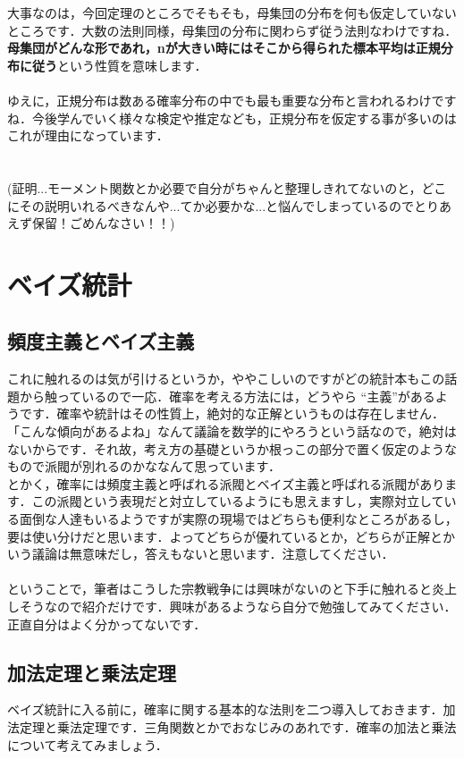 \documentclass[11pt,a4paper,uplatex]{ujreport} 	%
\begin{document}
大事なのは，今回定理のところでそもそも，母集団の分布を何も仮定していないところです．大数の法則同様，母集団の分布に関わらず従う法則なわけですね．\\

\textbf{母集団がどんな形であれ，nが大きい時にはそこから得られた標本平均は正規分布に従う}という性質を意味します．\\
\\

ゆえに，正規分布は数ある確率分布の中でも最も重要な分布と言われるわけですね．今後学んでいく様々な検定や推定なども，正規分布を仮定する事が多いのはこれが理由になっています．\\
\\
\\

(証明...モーメント関数とか必要で自分がちゃんと整理しきれてないのと，どこにその説明いれるべきなんや...てか必要かな...と悩んでしまっているのでとりあえず保留！ごめんなさい！！)


\newpage
\chapter{ベイズ統計}
\section{頻度主義とベイズ主義}
これに触れるのは気が引けるというか，ややこしいのですがどの統計本もこの話題から触っているので一応．確率を考える方法には，どうやら ``主義''があるようです．確率や統計はその性質上，絶対的な正解というものは存在しません．「こんな傾向があるよね」なんて議論を数学的にやろうという話なので，絶対はないからです．それ故，考え方の基礎というか根っこの部分で置く仮定のようなもので派閥が別れるのかななんて思っています．\\

とかく，確率には頻度主義と呼ばれる派閥とベイズ主義と呼ばれる派閥があります．この派閥という表現だと対立しているようにも思えますし，実際対立している面倒な人達もいるようですが実際の現場ではどちらも便利なところがあるし，要は使い分けだと思います．よってどちらが優れているとか，どちらが正解とかいう議論は無意味だし，答えもないと思います．注意してください．\\
\\

ということで，筆者はこうした宗教戦争には興味がないのと下手に触れると炎上しそうなので紹介だけです．興味があるようなら自分で勉強してみてください．正直自分はよく分かってないです．

\section{加法定理と乗法定理}
ベイズ統計に入る前に，確率に関する基本的な法則を二つ導入しておきます．加法定理と乗法定理です．三角関数とかでおなじみのあれです．確率の加法と乗法について考えてみましょう．\\
\\
\end{document}
